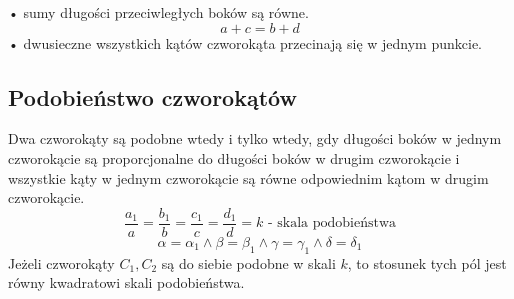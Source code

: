 \documentclass[14pt,a4paper]{extarticle}
\begin{document}
\noindent \;\;\;\;• \:sumy długości przeciwległych boków są równe.
$$a + c = b + d$$
\noindent \;\;\;\;• \:dwusieczne wszystkich kątów czworokąta przecinają się w jednym punkcie.
\MoveBelowBox

\subsection{Podobieństwo czworokątów}
Dwa czworokąty są podobne wtedy i tylko wtedy, gdy długości boków w jednym czworokącie są proporcjonalne
do długości boków w drugim czworokącie i wszystkie kąty w jednym czworokącie są równe odpowiednim
kątom w drugim czworokącie.
$$\dfrac{a_{1}}{a} = \dfrac{b_{1}}{b} = \dfrac{c_{1}}{c} = \dfrac{d_{1}}{d} = k\text{ - skala podobieństwa}$$
\hfill\break
$$\alpha = \alpha_{1} \land \beta = \beta_{1} \land \gamma = \gamma_{1} \land \delta = \delta_{1}$$
Jeżeli czworokąty $C_{1}, C_{2}$ są do siebie podobne w skali $k$, to stosunek tych pól jest równy
kwadratowi skali podobieństwa.
\end{document}
